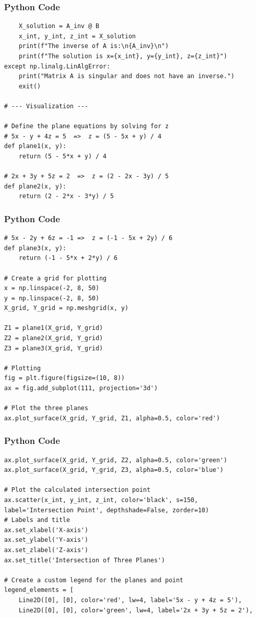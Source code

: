 \documentclass{beamer}
\begin{document}
\begin{frame}[fragile]
\frametitle{Python Code}
\begin{lstlisting}
    X_solution = A_inv @ B
    x_int, y_int, z_int = X_solution
    print(f"The inverse of A is:\n{A_inv}\n")
    print(f"The solution is x={x_int}, y={y_int}, z={z_int}")
except np.linalg.LinAlgError:
    print("Matrix A is singular and does not have an inverse.")
    exit()

# --- Visualization ---

# Define the plane equations by solving for z
# 5x - y + 4z = 5  =>  z = (5 - 5x + y) / 4
def plane1(x, y):
    return (5 - 5*x + y) / 4

# 2x + 3y + 5z = 2  =>  z = (2 - 2x - 3y) / 5
def plane2(x, y):
    return (2 - 2*x - 3*y) / 5
 \end{lstlisting}
\end{frame}
\begin{frame}[fragile]
\frametitle{Python Code}
\begin{lstlisting}
# 5x - 2y + 6z = -1 =>  z = (-1 - 5x + 2y) / 6
def plane3(x, y):
    return (-1 - 5*x + 2*y) / 6

# Create a grid for plotting
x = np.linspace(-2, 8, 50)
y = np.linspace(-2, 8, 50)
X_grid, Y_grid = np.meshgrid(x, y)

Z1 = plane1(X_grid, Y_grid)
Z2 = plane2(X_grid, Y_grid)
Z3 = plane3(X_grid, Y_grid)

# Plotting
fig = plt.figure(figsize=(10, 8))
ax = fig.add_subplot(111, projection='3d')

# Plot the three planes
ax.plot_surface(X_grid, Y_grid, Z1, alpha=0.5, color='red')
 \end{lstlisting}
\end{frame}
\begin{frame}[fragile]
\frametitle{Python Code}
\begin{lstlisting}
ax.plot_surface(X_grid, Y_grid, Z2, alpha=0.5, color='green')
ax.plot_surface(X_grid, Y_grid, Z3, alpha=0.5, color='blue')

# Plot the calculated intersection point
ax.scatter(x_int, y_int, z_int, color='black', s=150, label='Intersection Point', depthshade=False, zorder=10)
# Labels and title
ax.set_xlabel('X-axis')
ax.set_ylabel('Y-axis')
ax.set_zlabel('Z-axis')
ax.set_title('Intersection of Three Planes')

# Create a custom legend for the planes and point
legend_elements = [
    Line2D([0], [0], color='red', lw=4, label='5x - y + 4z = 5'),
    Line2D([0], [0], color='green', lw=4, label='2x + 3y + 5z = 2'),
     \end{lstlisting}
\end{frame}
\end{document}

